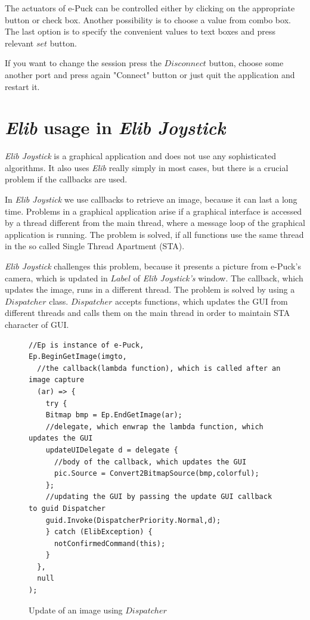   The actuators of e-Puck can be controlled either by clicking on the appropriate button or check box. 
  Another	possibility is to choose a value from combo box.
  The last option is to specify the  convenient values to text boxes and press relevant $set$ button.

  If you want to change the session press the $Disconnect$ button, choose some another port and 
  press again "Connect" button or	just quit the application and restart it.

  \section{{\it Elib} usage in {\it Elib Joystick}}\label{sec:joystick_trick}
  {\it Elib Joystick} is a graphical application and does not use any sophisticated algorithms. 
  It also uses {\it Elib} really simply in most cases, but there is a crucial problem if the callbacks are used.

  In {\it Elib Joystick} we use callbacks to retrieve an image, because it can last a long time.
  Problems in a graphical application arise if a graphical interface is accessed by a thread different from
  the main thread, where a message loop of the graphical application is running. The problem is solved,
  if all functions use the same thread in the so called Single Thread Apartment (STA).

  {\it Elib Joystick} challenges this problem, because it presents a picture from e-Puck's camera, which is updated
  in $Label$ of {\it Elib Joystick's} window. The callback, which updates the image, runs in a different thread.
  The problem is solved by using a $Dispatcher$ class. $Dispatcher$ accepts functions, which updates
  the GUI from different threads and calls them on the main thread in order to maintain STA character
  of GUI. 

\begin{figure}[!hbp]
\begin{lstlisting}
//Ep is instance of e-Puck,
Ep.BeginGetImage(imgto,
  //the callback(lambda function), which is called after an image capture
  (ar) => {
    try {
    Bitmap bmp = Ep.EndGetImage(ar);
    //delegate, which enwrap the lambda function, which updates the GUI
    updateUIDelegate d = delegate {
      //body of the callback, which updates the GUI
      pic.Source = Convert2BitmapSource(bmp,colorful);
    };
    //updating the GUI by passing the update GUI callback to guid Dispatcher
    guid.Invoke(DispatcherPriority.Normal,d);
    } catch (ElibException) {
      notConfirmedCommand(this);
    }
  }, 
  null
);
\end{lstlisting}
\caption{Update of an image using $Dispatcher$}
\label{updispatcher}
\end{figure}


